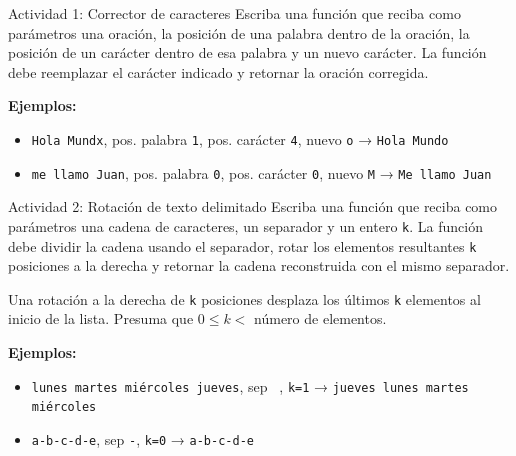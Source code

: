 \documentclass{ip-lab}
\begin{document}
\newpage

\begin{sectionbox}{Actividad 1: Corrector de caracteres}
Escriba una función que reciba como parámetros una oración, la posición de una palabra dentro de la oración, la posición de un carácter dentro de esa palabra y un nuevo carácter. La función debe reemplazar el carácter indicado y retornar la oración corregida.

\textbf{Ejemplos:}
\begin{itemize}
    \item \texttt{\textquotedbl Hola Mundx\textquotedbl}, pos. palabra \texttt{1}, pos. carácter \texttt{4}, nuevo \texttt{\textquotesingle o\textquotesingle} → \texttt{\textquotedbl Hola Mundo\textquotedbl}
    \item \texttt{\textquotedbl me llamo Juan\textquotedbl}, pos. palabra \texttt{0}, pos. carácter \texttt{0}, nuevo \texttt{\textquotesingle M\textquotesingle} → \texttt{\textquotedbl Me llamo Juan\textquotedbl}
\end{itemize}
\end{sectionbox}


\begin{sectionbox}{Actividad 2: Rotación de texto delimitado}
Escriba una función que reciba como parámetros una cadena de caracteres, un separador y un entero \texttt{k}. La función debe dividir la cadena usando el separador, rotar los elementos resultantes \texttt{k} posiciones a la derecha y retornar la cadena reconstruida con el mismo separador.

Una rotación a la derecha de \texttt{k} posiciones desplaza los últimos \texttt{k} elementos al inicio de la lista. Presuma que $0 \leq k < $ número de elementos.

\textbf{Ejemplos:}
\begin{itemize}
    \item \texttt{\textquotedbl lunes martes miércoles jueves\textquotedbl}, sep \texttt{\textquotedbl\ \textquotedbl}, \texttt{k=1} → \texttt{\textquotedbl jueves lunes martes miércoles\textquotedbl}
    \item \texttt{\textquotedbl a-b-c-d-e\textquotedbl}, sep \texttt{\textquotedbl-\textquotedbl}, \texttt{k=0} → \texttt{\textquotedbl a-b-c-d-e\textquotedbl}
\end{itemize}
\end{sectionbox}
\end{document}
